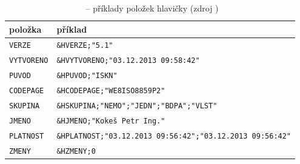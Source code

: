 \begin{table}[H]
    \begin{tabular}{|l|l|}
        \hline
         položka & příklad \\
        \hline
        \hline
         \texttt{VERZE} & \texttt{\&HVERZE;"5.1"} \\ \hline
         \texttt{VYTVORENO} & \texttt{\&HVYTVORENO;"03.12.2013 09:58:42"} \\ \hline
         \texttt{PUVOD} & \texttt{\&HPUVOD;"ISKN"} \\ \hline
         \texttt{CODEPAGE} & \texttt{\&HCODEPAGE;"WE8ISO8859P2"} \\ \hline
         \texttt{SKUPINA} & \texttt{\&HSKUPINA;"NEMO";"JEDN";"BDPA";"VLST"} \\ \hline
         \texttt{JMENO} & \texttt{\&HJMENO;"Kokeš Petr Ing."} \\ \hline
         \texttt{PLATNOST} & \texttt{\&HPLATNOST;"03.12.2013 09:56:42";"03.12.2013 09:56:42"} \\ \hline
         \texttt{ZMENY} & \texttt{\&HZMENY;0} \\
         \hline
    \end{tabular}
    \centering
    \caption[~– příklady položek hlavičky]{~– příklady položek hlavičky (zdroj \citep{struktura_vfk})}
    \label{tab:hlavicka_priklady}
\end{table}

